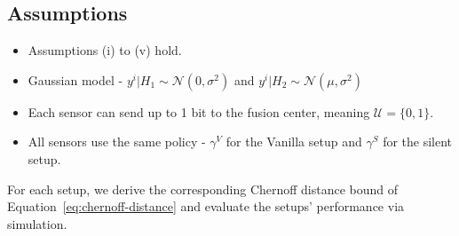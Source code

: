 \documentclass[11pt]{article}
\begin{document}
\subsection*{Assumptions}
\begin{itemize}
    \item Assumptions (i) to (v) hold.
    \item Gaussian model - $y^i|H_1 \sim \mathcal{N}(0,\sigma^2)$ and $y^i|H_2 \sim \mathcal{N}(\mu,\sigma^2)$
        \begin{figure}[h!]
            \centering
        \end{figure}
    \item Each sensor can send up to 1 bit to the fusion center, meaning $\mathcal{U} = \{0,1\}$.
    \item All sensors use the same policy - $\gamma^V$ for the Vanilla setup and $\gamma^S$ for the silent setup.
\end{itemize}
For each setup, we derive the corresponding Chernoff distance bound of Equation~\eqref{eq:chernoff-distance} and evaluate the setups' performance via simulation.
\end{document}
